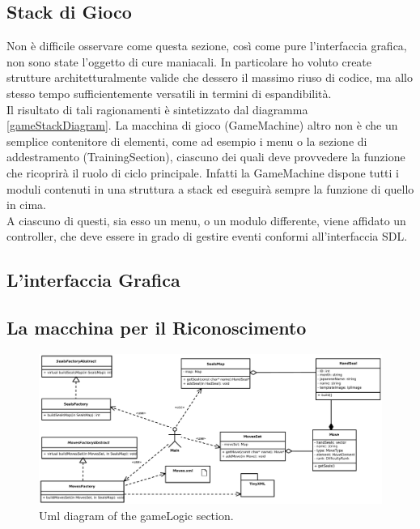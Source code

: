 \documentclass[a4paper,10pt, twocolumn]{article}
\begin{document}
  \subsection{Stack di Gioco}
  Non \`{e} difficile osservare come questa sezione, 
  cos\`{i} come pure l'interfaccia grafica, non sono state l'oggetto di cure maniacali.
  In particolare ho voluto create strutture architetturalmente valide che dessero il
  massimo riuso di codice, ma allo stesso tempo sufficientemente versatili in termini
  di espandibilit\`{a}.\\
  Il risultato di tali ragionamenti \`{e} sintetizzato dal diagramma \ref{gameStackDiagram}.
  La macchina di gioco (GameMachine) altro non \`{e} che un semplice contenitore di
  elementi, come ad esempio i menu o la sezione di addestramento (TrainingSection), 
  ciascuno dei quali deve provvedere la funzione che ricoprir\`{a} il ruolo di 
  ciclo principale. Infatti la GameMachine dispone tutti i moduli contenuti in una 
  struttura a stack ed eseguir\`{a} sempre la funzione di quello in cima.\\
  A ciascuno di questi, sia esso un menu, o un modulo differente, viene 
  affidato un controller, che deve essere in grado di gestire eventi 
  conformi all'interfaccia SDL.
  
  
  \subsection{L'interfaccia Grafica}
  \subsection{La macchina per il Riconoscimento}

\clearpage
\begin{figure}[t]
  \centering
    \includegraphics[scale=0.45]{UmlDiagrams/gameLogic.pdf}
    \caption{Uml diagram of the gameLogic section.}
  \label{gameLogicDiagram}     
  
  \end{figure}
  
\end{document}
